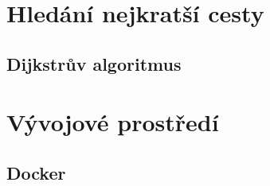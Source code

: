 %
%

\chapter{Hledání nejkratší cesty}

\section{Dijkstrův algoritmus}

\chapter{Vývojové prostředí}

\section{Docker}

